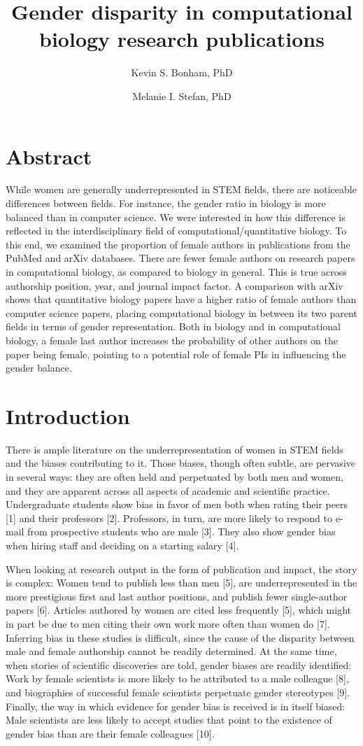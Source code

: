 \documentclass[11pt]{article}
\title{Gender disparity in computational biology research publications}
\author[1]{Kevin S. Bonham, PhD}
\author[2]{Melanie I. Stefan, PhD}
\affil[1]{Microbiology and Immunobiology, Harvard Medical School. Boston, MA, USA}
\affil[2]{Centre for Integrative Physiology, Edinburgh Medical School. Biomedical Sciences, University of Edinburgh. Edinburgh, United Kingdom}
\begin{document}
\maketitle
\section{Abstract}
While women are generally underrepresented in STEM fields, there are noticeable differences between fields. For instance, the gender ratio in biology is more balanced than in computer science. We were interested in how this difference is reflected in the interdisciplinary field of computational/quantitative biology. To this end, we examined the proportion of female authors in publications from the PubMed and arXiv databases. There are fewer female authors on research papers in computational biology, as compared to biology in general. This is true across authorship position, year, and journal impact factor. A comparison with arXiv shows that quantitative biology papers have a higher ratio of female authors than computer science papers, placing computational biology in between its two parent fields in terms of gender representation. Both in biology and in computational biology, a female last author increases the probability of other authors on the paper being female, pointing to a potential role of female PIs in influencing the gender balance.

\section{Introduction}
There is ample literature on the underrepresentation of women in STEM fields and the biases contributing to it. Those biases, though often subtle, are pervasive in several ways: they are often held and perpetuated by both men and women, and they are apparent across all aspects of academic and scientific practice. Undergraduate students show bias in favor of men both when rating their peers [1] and their professors [2]. Professors, in turn, are more likely to respond to e-mail from prospective students who are male [3]. They also show gender bias when hiring staff and deciding on a starting salary [4].

When looking at research output in the form of publication and impact, the story is complex: Women tend to publish less than men [5], are underrepresented in the more prestigious first and last author positions, and publish fewer single-author papers [6]. Articles authored by women are cited less frequently [5], which might in part be due to men citing their own work more often than women do [7]. Inferring bias in these studies is difficult, since the cause of the disparity between male and female authorship cannot be readily determined. At the same time, when stories of scientific discoveries are told, gender biases are readily identified: Work by female scientists is more likely to be attributed to a male colleague [8], and biographies of successful female scientists perpetuate gender stereotypes [9]. Finally, the way in which evidence for gender bias is received is in itself biased:  Male scientists are less likely to accept studies that point to the existence of gender bias than are their female colleagues [10].
\end{document}
